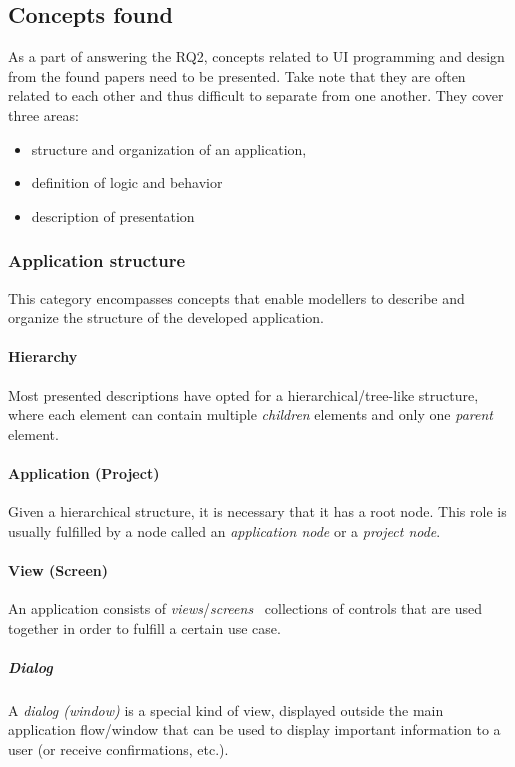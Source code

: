 \subsection{Concepts found}\label{subsec:concepts-found}

As a part of answering the RQ2, concepts related to UI programming and design from the found papers need to be presented.
Take note that they are often related to each other and thus difficult to separate from one another.
They cover three areas:
\begin{itemize}
    \item structure and organization of an application,
    \item definition of logic and behavior
    \item description of presentation
\end{itemize}

\subsubsection{Application structure}
This category encompasses concepts that enable modellers to describe and organize the structure of the developed application.

\paragraph{Hierarchy}
Most presented descriptions have opted for a hierarchical/tree-like structure, where each element can contain multiple \emph{children} elements and only one \emph{parent} element.

\paragraph{Application (Project)}
Given a hierarchical structure, it is necessary that it has a root node.
This role is usually fulfilled by a node called an \emph{application node} or a \emph{project node}.

\paragraph{View (Screen)}
An application consists of \emph{views}/\emph{screens} \textendash\ collections of controls that are used together in order to fulfill a certain use case.

\subparagraph{Dialog}
A \emph{dialog (window)} is a special kind of view, displayed outside the main application flow/window that can be used to display important information to a user (or receive confirmations, etc.).

